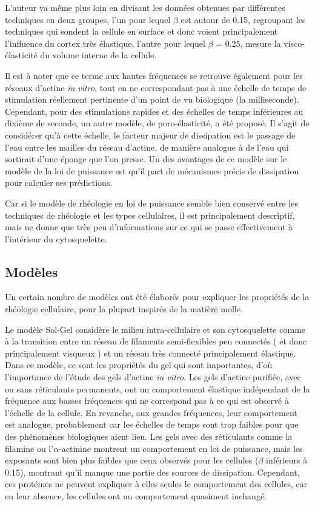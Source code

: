 L'auteur va même plus loin en divisant les données obtenues par différentes techniques en deux groupes, l'un pour lequel $\beta$ est autour de 0.15, regroupant les techniques qui sondent la cellule en surface et donc voient principalement l'influence du cortex très élastique, l'autre pour lequel $\beta$ = 0.25, mesure la visco-élasticité du volume interne de la cellule. 

Il est à noter que ce terme aux hautes fréquences se retrouve également pour les réseaux d'actine \textit{in vitro}, tout en ne correspondant pas à une échelle de temps de stimulation réellement pertinente d'un point de vu biologique (la milliseconde). 
Cependant, pour des stimulations rapides et des échelles de temps inférieures au dixième de seconde, un autre modèle, de poro-élasticité, a été proposé. 
Il s'agit de considérer qu'à cette échelle, le facteur majeur de dissipation est le passage de l'eau entre les mailles du réseau d'actine, de manière analogue à de l'eau qui sortirait d'une éponge que l'on presse.  
Un des avantages de ce modèle sur le modèle de la loi de puissance est qu'il part de mécanismes précis de dissipation pour calculer ses prédictions. 

Car si le modèle de rhéologie en loi de puissance semble bien conservé entre les techniques de rhéologie et les types cellulaires, il est principalement descriptif, mais ne donne que très peu d'informations sur ce qui se passe effectivement à l'intérieur du cytosquelette. 

\subsection{Modèles}

Un certain nombre de modèles ont été élaborés pour expliquer les propriétés de la rhéologie cellulaire, pour la plupart inspirés de la matière molle. 

Le modèle Sol-Gel considère le milieu intra-cellulaire et son cytosquelette comme à la transition entre un réseau de filaments semi-flexibles peu connectés ( et donc principalement visqueux ) et un réseau très connecté principalement élastique. 
Dans ce modèle, ce sont les propriétés du gel qui sont importantes,  d'où l'importance de l'étude des gels d'actine \textit{in vitro}. 
Les gels d'actine purifiée, avec ou sans réticulants permanents, ont un comportement élastique indépendant de la fréquence aux basses fréquences qui ne correspond pas à ce qui est observé à l'échelle de la cellule. En revanche, aux grandes fréquences, leur comportement est analogue, probablement car les échelles de temps sont trop faibles pour que des phénomènes biologiques aient lieu. 
Les gels avec des réticulants comme la filamine ou l'$\alpha$-actinine montrent un comportement en loi de puissance, mais les exposants sont bien plus faibles que ceux observés pour les cellules ($\beta$ inférieurs à 0.15), montrant qu'il manque une partie des sources de dissipation.
Cependant, ces protéines ne peuvent expliquer à elles seules le comportement des cellules, car en leur absence, les cellules ont un comportement quasiment inchangé. 

